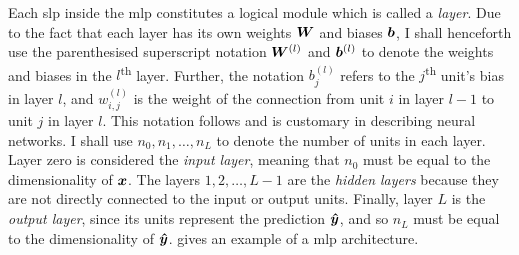 \documentclass[../report.tex]{subfiles}
\begin{document}
Each \gls{slp} inside the \gls{mlp} constitutes a logical module which is called a \emph{layer}.
Due to the fact that each layer has its own weights ${\bm{W}}$ and biases ${\bm{b}}$, I shall henceforth use the parenthesised superscript notation ${\bm{W}}^{(l)}$ and ${\bm{b}}^{(l)}$ to denote the weights and biases in the $l$\textsuperscript{th} layer.
Further, the notation $b_j^{(l)}$ refers to the $j$\textsuperscript{th} unit's bias in layer $l$, and $w_{i,j}^{(l)}$ is the weight of the connection from unit $i$ in layer $l-1$ to unit $j$ in layer $l$.
This notation follows \textcite{goodfellow2016} and is customary in describing neural networks.
I shall use $n_0,n_1,\dots,n_L$ to denote the number of units in each layer.
Layer zero is considered the \emph{input layer}, meaning that $n_0$ must be equal to the dimensionality of ${\bm{x}}$. 
The layers $1, 2, \dots, L-1$ are the \emph{hidden layers} because they are not directly connected to the input or output units.
Finally, layer $L$ is the \emph{output layer}, since its units represent the prediction ${\bm{\hat{y}}}$, and so $n_L$ must be equal to the dimensionality of ${\bm{\hat{y}}}$. 
 gives an example of a \gls{mlp} architecture.
\end{document}
